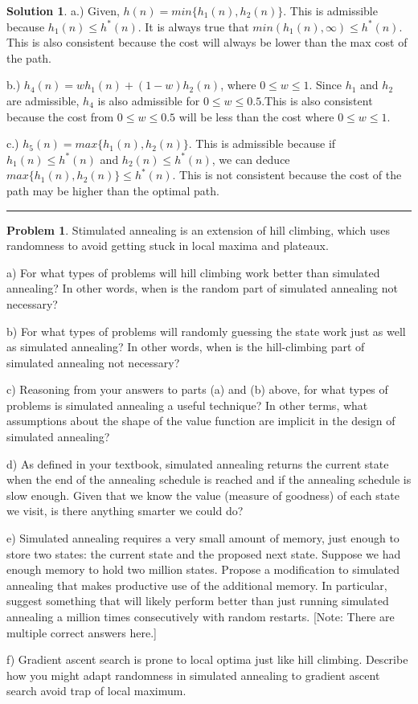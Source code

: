 \documentclass{article}
\theoremstyle{definition}
\newtheorem{problem}{Problem}
\def\fline{\rule{0.75\linewidth}{0.5pt}}
\newcommand{\finishline}{\begin{center}\fline\end{center}}
\newtheorem*{solution*}{Solution}
\newenvironment{solution}{\begin{solution*}}{{\finishline} \end{solution*}}
\begin{document}
\begin{solution}
	\item a.) Given, $h(n) = min\{h_1(n),h_2(n)\}$. This is admissible because $h_1(n) \leq h^*(n)$. It is always true that $min(h_1(n), \infty) \leq h^*(n)$. This is also consistent because the cost will always be lower than the max cost of the path. 
	\item b.) $h_4(n) = wh_1(n) + (1-w)h_2(n)$, where $0 \leq w \leq 1$. Since $h_1$ and $h_2$ are admissible, $h_4$ is also admissible for $0 \leq w \leq 0.5$.This is also consistent because the cost from  $0 \leq w \leq 0.5$ will be less than the cost where $0 \leq w \leq 1$.
	\item c.) $h_5(n) = max\{h_1(n), h_2(n)\}$. This is admissible because if $h_1(n) \leq h^*(n)$ and $h_2(n) \leq h^*(n)$, we can deduce $ max\{h_1(n), h_2(n)\} \leq h^*(n)$. This is not consistent because the cost of the path may be higher than the optimal path. 
    
    
\end{solution}

\begin{problem} %
    Stimulated annealing is an extension of hill climbing, which uses randomness to avoid getting stuck in local maxima and plateaux.
    
    \item a) For what types of problems will hill climbing work better than simulated annealing? In other words, when is the random part of simulated annealing not necessary?
    \item b) For what types of problems will randomly guessing the state work just as well as simulated annealing? In other words, when is the hill-climbing part of simulated annealing not necessary?
    \item c) Reasoning from your answers to parts (a) and (b) above, for what types of problems is simulated annealing a useful technique? In other terms, what assumptions about the shape of the value function are implicit in the design of simulated annealing?
    \item d) As defined in your textbook, simulated annealing returns the current state when the end of the annealing schedule is reached and if the annealing schedule is slow enough. Given that we know the value (measure of goodness) of each state we visit, is there anything smarter we could do?
    \item e) Simulated annealing requires a very small amount of memory, just enough to store two states: the current state and the proposed next state. Suppose we had enough memory to hold two million states. Propose a modification to simulated annealing that makes productive use of the additional memory. In particular, suggest something that will likely perform better than just running simulated annealing a million times consecutively with random restarts. [Note: There are multiple correct answers here.]
    \item f) Gradient ascent search is prone to local optima just like hill climbing. Describe how you might adapt randomness in simulated annealing to gradient ascent search avoid trap of local maximum.

\end{problem}
\end{document}
